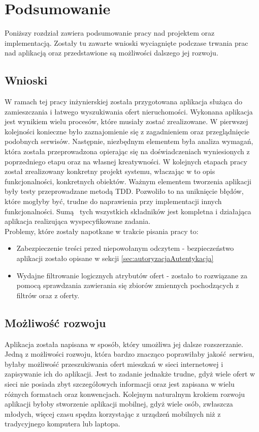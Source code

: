 \chapter{Podsumowanie}
\label{cha:podsumowanie}

Poniższy rozdział zawiera podsumowanie pracy nad projektem oraz implementacją. Zostały tu zawarte wnioski wyciagnięte podczase trwania prac nad aplikacją oraz przedstawione są możliwości dalszego jej rozwoju.

\section{Wnioski}
W ramach tej pracy inżynierskiej została przygotowana aplikacja służąca do zamieszczania i łatwego wyszukiwania ofert nieruchomości. Wykonana aplikacja jest wynikiem wielu procesów, które musiały zostać zrealizowane. W pierwszej kolejności konieczne było zaznajomienie się z zagadnieniem oraz przeglądnięcie podobnych serwisów. Następnie, niezbędnym elementem była analiza wymagań, która została przeprowadzona opierając się na doświadczeniach wyniesionych z poprzedniego etapu oraz na własnej kreatywności. W kolejnych etapach pracy został zrealizowany konkretny projekt systemu, właczając w to opis funkcjonalności, konkretnych obiektów. Ważnym elementem tworzenia aplikacji były testy przeprowadzane metodą TDD. Pozwoliło to na uniknięcie błędów, które mogłyby być, trudne do naprawienia przy implementacji innych funkcjonalności. Sumą  tych wszystkich składników jest kompletna i działająca aplikacja realizująca wyspecyfikowane zadania.\\
Problemy, które zostały napotkane w trakcie pisania pracy to:
\begin{itemize}
\item Zabezpieczenie treści przed niepowołanym odczytem - bezpieczeństwo aplikacji zostało opisane w sekcji  \ref{sec:autoryzacjaAutentykacja}
\item Wydajne filtrowanie logicznych atrybutów ofert - zostało to rozwiązane za pomocą sprawdzania zawierania się zbiorów zmiennych pochodzących z filtrów oraz z oferty.
\end{itemize}

\section{Możliwość rozwoju}
Aplikacja została napisana w sposób, który umożliwa jej dalsze rozszerzanie. Jedną z możliwości rozwoju, która bardzo znacząco poprawiłaby jakość serwisu, byłaby możliwość przeszukiwania ofert mieszkań w sieci internetowej i zapisywanie ich do aplikacji. Jest to zadanie jednakże trudne, gdyż wiele ofert w sieci nie posiada zbyt szczegółowych informacji oraz jest zapisana w wielu różnych formatach oraz konwencjach. Kolejnym naturalnym krokiem rozwoju aplikacji byłoby stworzenie aplikacji mobilnej, gdyż wiele osób, zwłaszcza młodych, więcej czasu spędza korzystając z urządzeń mobilnych niż z tradycyjnego komputera lub laptopa.
